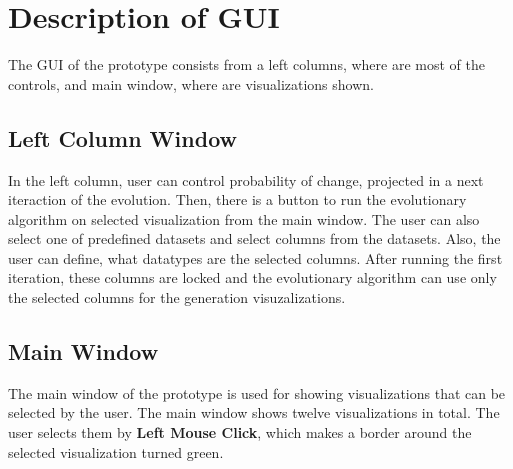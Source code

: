   \section{Description of GUI}
  The GUI of the prototype consists from a left columns, where are most of the controls, and main window, where are visualizations shown.
    \subsection{Left Column Window}
    In the left column, user can control probability of change, projected in a next iteraction of the evolution. Then, there is a button to run the evolutionary algorithm on selected visualization from the main window. The user can also select one of predefined datasets and select columns from the datasets. Also, the user can define, what datatypes are the selected columns. After running the first iteration, these columns are locked and the evolutionary algorithm can use only the selected columns for the generation visuzalizations.

    \subsection{Main Window}
    The main window of the prototype is used for showing visualizations that can be selected by the user. The main window shows twelve visualizations in total. The user selects them by \textbf{Left Mouse Click}, which makes a border around the selected visualization turned green.
